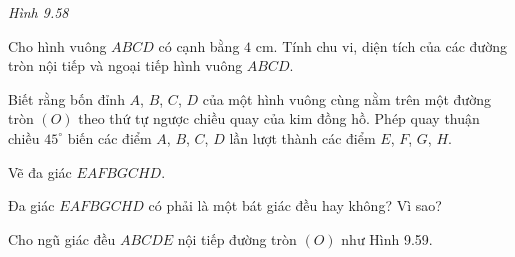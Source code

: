 \begin{exercises}
\begin{questions}[resume=SGK]
\begin{center}
            \textit{Hình 9.58}
        \end{center}

        \answerline
        \answerline
        \answerline
        \answerline

        \item Cho hình vuông $ABCD$ có cạnh bằng $4$ cm. Tính chu vi, diện tích của các đường tròn nội tiếp và ngoại tiếp hình vuông $ABCD$.

        \answerline
        \answerline
        \answerline
        \answerline

        \item Biết rằng bốn đỉnh $A$, $B$, $C$, $D$ của một hình vuông cùng nằm trên một đường tròn $(O)$ theo thứ tự ngược chiều quay của kim đồng hồ. Phép quay thuận chiều $45^\circ$ biến các điểm $A$, $B$, $C$, $D$ lần lượt thành các điểm $E$, $F$, $G$, $H$.
        \begin{questions}
            \item Vẽ đa giác $EAFBGCHD$.

            \answerline
            \answerline
            \answerline
            \answerline

            \item Đa giác $EAFBGCHD$ có phải là một bát giác đều hay không? Vì sao?

            \answerline
            \answerline
            \answerline
        \end{questions}

        \item Cho ngũ giác đều $ABCDE$ nội tiếp đường tròn $(O)$ như Hình 9.59.

        \begin{center}


\end{center}
\end{questions}
\end{exercises}

